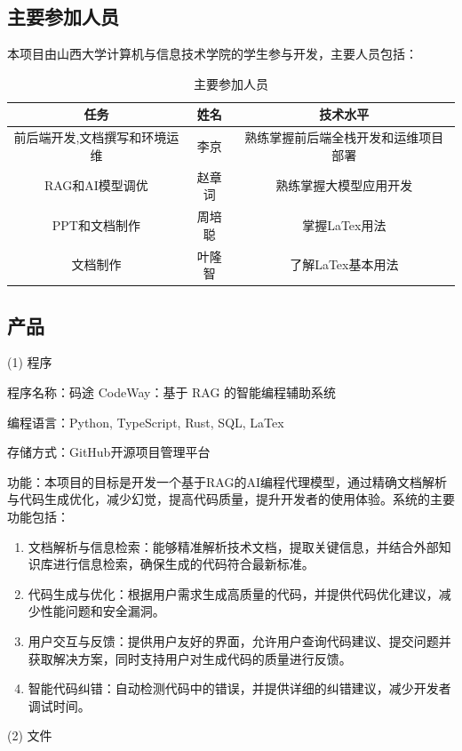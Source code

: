 \documentclass[
    report,     %
    oneside,    %
    UTF8,       %
    zihao=-4    %
]{config} %
\begin{document}
\subsection{主要参加人员}
本项目由山西大学计算机与信息技术学院的学生参与开发，主要人员包括：
\begin{table}[H] %
    \centering %
    \caption{主要参加人员} %
    \label{tab:participants} %
    \renewcommand\arraystretch{0.85} %
    \setlength{\tabcolsep}{12pt} %
    \begin{tabular}{ccc}
        \toprule[1.5pt] %
        \textbf{任务} & \textbf{姓名} & \textbf{技术水平} \\ %
        \midrule[0.8pt] %
            前后端开发,文档撰写和环境运维 & 李京 & 熟练掌握前后端全栈开发和运维项目部署 \\ %
            RAG和AI模型调优 & 赵章词 & 熟练掌握大模型应用开发 \\ %
            PPT和文档制作 & 周培聪 & 掌握LaTex用法 \\ %
            文档制作 & 叶隆智 & 了解LaTex基本用法 \\ %
        \hline\hline %
    \end{tabular}
\end{table}


\subsection{产品}

(1) 程序

程序名称：码途 CodeWay：基于 RAG 的智能编程辅助系统

编程语言：Python, TypeScript, Rust, SQL, LaTex

存储方式：GitHub开源项目管理平台

功能：本项目的目标是开发一个基于RAG的AI编程代理模型，通过精确文档解析与代码生成优化，减少幻觉，提高代码质量，提升开发者的使用体验。系统的主要功能包括：

\begin{enumerate}
    \item 文档解析与信息检索：能够精准解析技术文档，提取关键信息，并结合外部知识库进行信息检索，确保生成的代码符合最新标准。
    \item 代码生成与优化：根据用户需求生成高质量的代码，并提供代码优化建议，减少性能问题和安全漏洞。
    \item 用户交互与反馈：提供用户友好的界面，允许用户查询代码建议、提交问题并获取解决方案，同时支持用户对生成代码的质量进行反馈。
    \item 智能代码纠错：自动检测代码中的错误，并提供详细的纠错建议，减少开发者调试时间。
\end{enumerate}
(2) 文件
\end{document}
